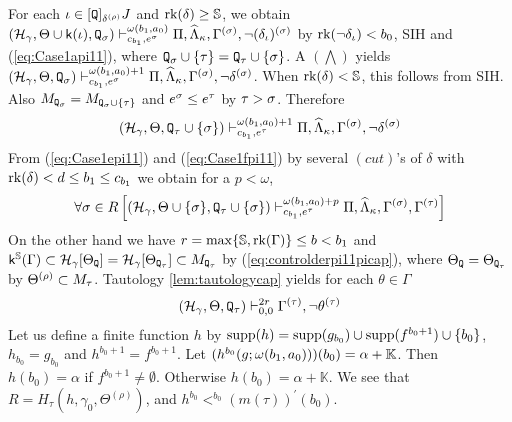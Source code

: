 \documentclass{article}
\newcommand{\mS}{\mathbb{S}}
\begin{document}
For each $\iota\in[{\tt Q}]_{\delta^{(\rho)}}J$ and $\rk(\del)\geq\mS$, we obtain
$
(\mathcal{H}_{\gamma},\Theta\cup{\sf k}(\iota),
{\tt Q}_{\sigma}
)
\vdash^{\omega(b_{1},a_{0})}_{c_{b_{1}},e^{\sigma}}
\Pi,\widehat{\Lambda}_{\kappa},\Gamma^{(\sigma)},\lnot(\delta_{\iota})^{(\sigma)}
$ by $\mbox{{\rm rk}}(\lnot\delta_{\iota})<b_{0}$, SIH and (\ref{eq:Case1api11}), where ${\tt Q}_{\sigma}\cup\{\tau\}={\tt Q}_{\tau}\cup\{\sigma\}$.
A $(\bigwedge)$ yields
$
(\mathcal{H}_{\gamma},\Theta,
{\tt Q}_{\sigma}
)
\vdash^{\omega(b_{1},a_{0})+1}_{c_{b_{1}},e^{\sigma}}
\Pi,\widehat{\Lambda}_{\kappa},\Gamma^{(\sigma)},\lnot\delta^{(\sigma)}
$.
When $\rk(\del)<\mS$, this follows from SIH.
Also $M_{{\tt Q}_{\sigma}}=M_{{\tt Q}_{\sigma}\cup\{\tau\}}$ and
$e^{\sigma}\leq e^{\tau}$ by $\tau>\sigma$.
Therefore
\begin{equation}\label{eq:Case1fpi11}
(\mathcal{H}_{\gamma},\Theta,
{\tt Q}_{\tau}\cup\{\sigma\}
)
\vdash^{\omega(b_{1},a_{0})+1}_{c_{b_{1}},e^{\tau}}
\Pi,\widehat{\Lambda}_{\kappa},\Gamma^{(\sigma)},\lnot\delta^{(\sigma)}
\end{equation}
From (\ref{eq:Case1epi11})  and (\ref{eq:Case1fpi11}) 
by several $(cut)$'s of $\delta$ with 
${\rm rk}(\delta)<d\leq b_{1}\leq c_{b_{1}}$
we obtain 
for a $p<\omega$,
\begin{equation} \label{eq:Case1gpi11}
\forall \sigma\in R
\left[
(\mathcal{H}_{\gamma},\Theta\cup\{\sigma\},
{\tt Q}_{\tau}\cup\{\sigma\}
)
\vdash^{\omega(b_{1},a_{0})+p}_{c_{b_{1}},e^{\tau}}
\Pi,\widehat{\Lambda}_{\kappa},\Gamma^{(\sigma)},\Gamma^{(\tau)}
\right]
\end{equation}
On the other hand we have $r=\max\{\mS,\rk(\Gam)\}\leq b<b_{1}$
and $\sfk^{\mS}(\Gam)\subset \calh_{\gam}[\Tht_{{\tt Q}}]=\calh_{\gam}[\Tht_{{\tt Q}_{\tau}}]\subset M_{{\tt Q}_{\tau}}$ by (\ref{eq:controlderpi11picap}), where
$\Theta_{{\tt Q}}=\Theta_{{\tt Q}_{\tau}}$ by $\Theta^{(\rho)}\subset M_{\tau}$.
Tautology \ref{lem:tautologycap} yields
for each $\theta\in\Gamma$
\begin{equation}\label{eq:Case1hpi11}
(\mathcal{H}_{\gamma},\Theta,{\tt Q}_{\tau}
)\vdash^{2r}_{0,0}
\Gamma^{(\tau)},\lnot \theta^{(\tau)}
\end{equation}
Let us define a finite function $h$ by
${\rm supp}(h)={\rm supp}(g_{b_{0}})\cup{\rm supp}(f^{b_{0}+1})\cup\{b_{0}\}$,
$h_{b_{0}}=g_{b_{0}}$ and $h^{b_{0}+1}=f^{b_{0}+1}$.
Let $(h^{b_{0}}(g;\omega(b_{1},a_{0})))(b_{0})=\alpha+\mathbb{K}$.
Then $h(b_{0})=\alpha$ if $f^{b_{0}+1}\neq\emptyset$.
Otherwise $h(b_{0})=\alpha+\mathbb{K}$.
We see that 
$R=H_{\tau}(h,\gamma_{0},\Theta^{(\rho)})$,
and $
h^{b_{0}}<^{b_{0}}
\left(m(\tau)\right)^{\prime}(b_{0})$.
\end{document}
